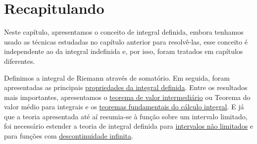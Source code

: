 \cleardoublepage\documentclass[../main.tex]{subfiles}
\begin{document}
\section{Recapitulando}
Neste capítulo, apresentamos o conceito de integral definida, embora tenhamos usado as técnicas estudadas no capítulo anterior para resolvê-las, esse conceito é independente ao da integral indefinida e, por isso, foram tratados em capítulos diferentes.

Definimos a  integral de Riemann através de somatório. Em seguida, foram apresentadas as principais \hyperlink{PropIntDef}{propriedades da integral definida}. Entre os resultados mais importantes, apresentamos o \hyperlink{TVI}{teorema de valor intermediário} ou Teorema do valor médio para integrais e os \hyperlink{TFC}{teoremas fundamentais do cálculo integral}. E já que a teoria apresentada até aí resumia-se à função sobre um intervalo limitado, foi necessário estender a teoria de integral definida para \hyperlink{LimInf}{intervalos não limitados} e para funções com \hyperlink{LimInf2}{descontinuidade infinita}.
\end{document}
